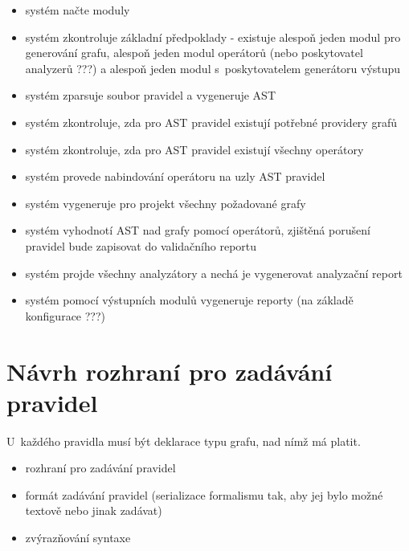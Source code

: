
\begin{itemize}
\item systém načte moduly
\item systém zkontroluje základní předpoklady - existuje alespoň jeden modul pro generování grafu, alespoň jeden modul operátorů (nebo poskytovatel analyzerů ???) a alespoň jeden modul s~poskytovatelem generátoru výstupu
\item systém zparsuje soubor pravidel a vygeneruje AST
\item systém zkontroluje, zda pro AST pravidel existují potřebné providery grafů
\item systém zkontroluje, zda pro AST pravidel existují všechny operátory
\item systém provede nabindování operátoru na uzly AST pravidel
\item systém vygeneruje pro projekt všechny požadované grafy
\item systém vyhodnotí AST nad grafy pomocí operátorů, zjištěná porušení pravidel bude zapisovat do validačního reportu
\item systém projde všechny analyzátory a nechá je vygenerovat analyzační report
\item systém pomocí výstupních modulů vygeneruje reporty (na základě konfigurace ???)
\end{itemize}

\section{Návrh rozhraní pro zadávání pravidel}
U~každého pravidla musí být deklarace typu grafu, nad nímž má platit.
\begin{itemize}
\item rozhraní pro zadávání pravidel
\item formát zadávání pravidel (serializace formalismu tak, aby jej bylo možné textově nebo jinak zadávat)
\item zvýrazňování syntaxe
\end{itemize}

